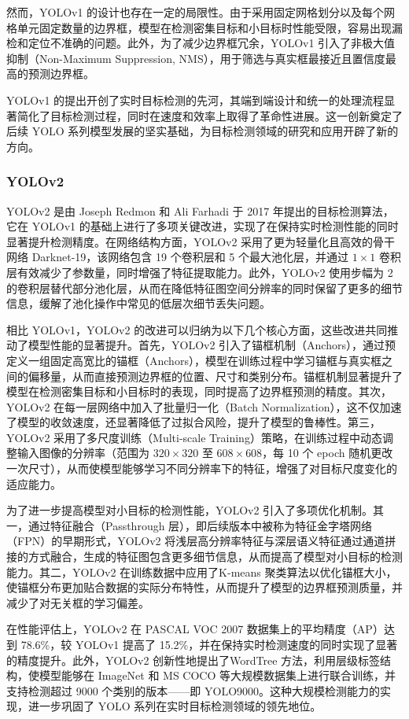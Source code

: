 \documentclass[11pt,twocolumn]{ctexart}
\begin{document}
然而，YOLOv1 的设计也存在一定的局限性。由于采用固定网格划分以及每个网格单元固定数量的边界框，模型在检测密集目标和小目标时性能受限，容易出现漏检和定位不准确的问题。此外，为了减少边界框冗余，YOLOv1 引入了非极大值抑制\cite{neubeck2006efficient}（Non-Maximum Suppression, NMS），用于筛选与真实框最接近且置信度最高的预测边界框。

YOLOv1 的提出开创了实时目标检测的先河，其端到端设计和统一的处理流程显著简化了目标检测过程，同时在速度和效率上取得了革命性进展。这一创新奠定了后续 YOLO 系列模型发展的坚实基础，为目标检测领域的研究和应用开辟了新的方向。
\subsubsection{YOLOv2}
YOLOv2\cite{redmon2017yolo9000} 是由 Joseph Redmon 和 Ali Farhadi 于 2017 年提出的目标检测算法，它在 YOLOv1 的基础上进行了多项关键改进，实现了在保持实时检测性能的同时显著提升检测精度。在网络结构方面，YOLOv2 采用了更为轻量化且高效的骨干网络 Darknet-19，该网络包含 19 个卷积层和 5 个最大池化层，并通过 $1 \times 1$ 卷积层有效减少了参数量，同时增强了特征提取能力。此外，YOLOv2 使用步幅为 2 的卷积层替代部分池化层，从而在降低特征图空间分辨率的同时保留了更多的细节信息，缓解了池化操作中常见的低层次细节丢失问题。

相比 YOLOv1，YOLOv2 的改进可以归纳为以下几个核心方面，这些改进共同推动了模型性能的显著提升。首先，YOLOv2 引入了锚框机制（Anchors），通过预定义一组固定高宽比的锚框（Anchors），模型在训练过程中学习锚框与真实框之间的偏移量，从而直接预测边界框的位置、尺寸和类别分布。锚框机制显著提升了模型在检测密集目标和小目标时的表现，同时提高了边界框预测的精度。其次，YOLOv2 在每一层网络中加入了批量归一化（Batch Normalization），这不仅加速了模型的收敛速度，还显著降低了过拟合风险，提升了模型的鲁棒性。第三，YOLOv2 采用了多尺度训练（Multi-scale Training）策略，在训练过程中动态调整输入图像的分辨率（范围为 $320 \times 320$ 至 $608 \times 608$，每 10 个 epoch 随机更改一次尺寸），从而使模型能够学习不同分辨率下的特征，增强了对目标尺度变化的适应能力。

为了进一步提高模型对小目标的检测性能，YOLOv2 引入了多项优化机制。其一，通过特征融合（Passthrough 层），即后续版本中被称为特征金字塔网络（FPN）的早期形式，YOLOv2 将浅层高分辨率特征与深层语义特征通过通道拼接的方式融合，生成的特征图包含更多细节信息，从而提高了模型对小目标的检测能力。其二，YOLOv2 在训练数据中应用了K-means 聚类算法以优化锚框大小，使锚框分布更加贴合数据的实际分布特性，从而提升了模型的边界框预测质量，并减少了对无关框的学习偏差。

在性能评估上，YOLOv2 在 PASCAL VOC 2007 数据集上的平均精度（AP）达到 78.6\%，较 YOLOv1 提高了 15.2\%，并在保持实时检测速度的同时实现了显著的精度提升。此外，YOLOv2 创新性地提出了WordTree 方法，利用层级标签结构，使模型能够在 ImageNet 和 MS COCO 等大规模数据集上进行联合训练，并支持检测超过 9000 个类别的版本——即 YOLO9000。这种大规模检测能力的实现，进一步巩固了 YOLO 系列在实时目标检测领域的领先地位。
\end{document}
